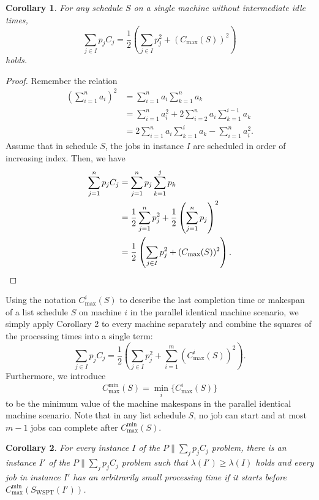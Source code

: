 \documentclass[11pt]{article}
\newtheorem{corollary}{Corollary}
\newcommand{\WSPT}{\mathrm{WSPT}}
\newcommand{\Cmax}{C_{\max}}
\newcommand{\Cmin}{C_{\max}^{\min}}
\begin{document}
\begin{corollary}
For any schedule $S$ on a single machine without intermediate idle times,
\[
        \sum_{j\in I}p_j C_j
        =
        \frac12\left(\sum_{j\in I}p_j^2+(\Cmax(S))^2\right)
\]
holds.
\end{corollary}

\begin{proof}
Remember the relation
\[
\begin{aligned}
        \left(\sum_{i=1}^n a_i\right)^2
        &=
        \sum_{i=1}^n a_i\sum_{k=1}^n a_k                         \\
        &=
        \sum_{i=1}^n a_i^2
        +2\sum_{i=2}^n a_i\sum_{k=1}^{i-1}a_k                    \\
        &=
        2\sum_{i=1}^n a_i\sum_{k=1}^{i}a_k-\sum_{i=1}^n a_i^2 .
\end{aligned}
\]
Assume that in schedule $S$, the jobs in instance $I$ are scheduled in order
of increasing index. Then, we have
\[
\begin{aligned}
        \sum_{j=1}^n p_j C_j
        &=
        \sum_{j=1}^n p_j\sum_{k=1}^j p_k                         \\
        &=
        \frac12\sum_{j=1}^n p_j^2
        +\frac12\left(\sum_{j=1}^n p_j\right)^2                  \\
        &=
        \frac12\left(\sum_{j\in I}p_j^2+(\Cmax(S))^2\right).
        \qedhere
\end{aligned}
\]
\end{proof}

Using the notation $C_{\max}^i(S)$ to describe the last completion time or
makespan of a list schedule $S$ on machine $i$ in the parallel identical
machine scenario, we simply apply Corollary 2 to every machine separately and
combine the squares of the processing times into a single term:
\begin{equation}
        \sum_{j\in I} p_j C_j
        =
        \frac12
        \left(
            \sum_{j\in I}p_j^2
            +
            \sum_{i=1}^m (C_{\max}^i(S))^2
        \right).
\end{equation}
Furthermore, we introduce
\[
        \Cmin(S)=\min_i\{C_{\max}^i(S)\}
\]
to be the minimum value of the machine makespans in the parallel identical
machine scenario. Note that in any list schedule $S$, no job can start and at
most $m-1$ jobs can complete after $\Cmin(S)$.

\begin{corollary}
For every instance $I$ of the $P\|\sum_j p_j C_j$ problem, there is an
instance $I'$ of the $P\|\sum_j p_j C_j$ problem such that
$\lambda(I')\geq\lambda(I)$ holds and every job in instance $I'$ has an
arbitrarily small processing time if it starts before
$\Cmin(S_{\WSPT}(I'))$.
\end{corollary}
\end{document}
